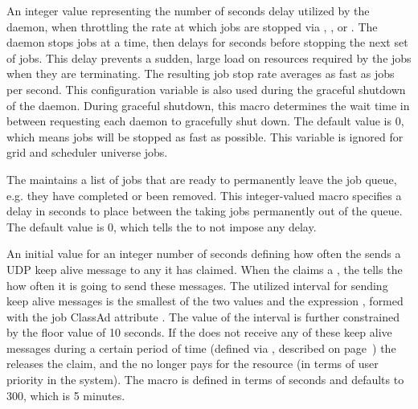 \begin{description}
\label{param:JobStopDelay}
\item[\Macro{JOB\_STOP\_DELAY}]
  An integer value representing the number of seconds delay utilized by
  the  daemon, when throttling the rate at which jobs
  are stopped via , , or .  
  The   daemon stops
   jobs at a time, then delays for
   seconds before stopping the next set of jobs.
  This delay prevents a sudden, large load on resources required by
  the jobs when they are terminating.
  The resulting job stop rate averages as fast as
   jobs per second.
  This configuration variable is also used during the graceful shutdown of the
   daemon.
  During graceful shutdown, this macro determines the wait time in
  between requesting each  daemon to gracefully shut down.  
  The default value is 0, which means jobs will be stopped as fast as possible.
  This variable is ignored for grid and scheduler universe jobs.

\label{param:JobIsFinishedInterval}
\item[\Macro{JOB\_IS\_FINISHED\_INTERVAL}]
  The  maintains a list of jobs that are ready to permanently
  leave the job queue, e.g. they have completed or been removed.  This
  integer-valued macro specifies a delay in seconds to place between the
  taking jobs permanently out of the queue.  The default value is 0, which
  tells the  to not impose any delay.  
  
\label{param:AliveInterval}
\item[\Macro{ALIVE\_INTERVAL}]
  An initial value for an integer number of seconds defining
  how often the  sends a UDP keep
  alive message to any  it has claimed.
  When the  claims a , 
  the  tells the  how often it is
  going to send these messages.
  The utilized interval for sending keep alive messages is the smallest of
  the two values  and the expression
  , formed with the job ClassAd attribute
  .
  The value of the interval is further constrained by the floor value 
  of 10 seconds.
  If the  does not receive any of these keep alive messages
  during a certain period of time (defined via
  , described on
  page~\pageref{param:MaxClaimAlivesMissed})
  the  releases the claim, and the  no longer pays for
  the resource (in terms of user priority in the system).
  The macro is defined in terms of seconds and defaults to 300, which is
  5 minutes.


\end{description}
